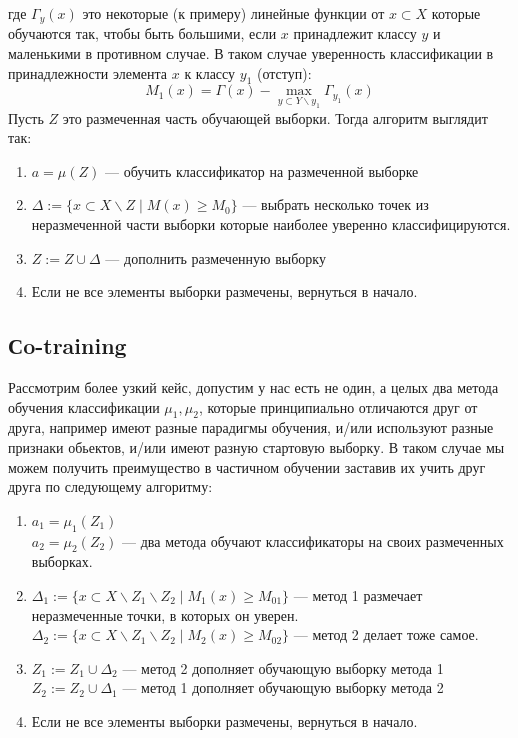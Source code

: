 где $\Gamma_y(x)$ это некоторые (к примеру) линейные функции от $x \subset X$ которые обучаются так, чтобы быть большими, если $x$ принадлежит классу $y$ и маленькими в противном случае. В таком случае уверенность классификации в принадлежности элемента $x$ к классу $y_1$ (отступ):
\begin{equation*}
    M_1(x) = \Gamma(x) - \max_{y \subset Y\backslash y_1}\Gamma_{y_1}(x)
\end{equation*}
Пусть $Z$ это размеченная часть обучающей выборки. Тогда алгоритм выглядит так:
\begin{enumerate}
    \item $a = \mu(Z)$ --- обучить классификатор на размеченной выборке
    \item $\Delta := \{x \subset X\backslash Z \;|\; M(x) \geq M_0 \}$ --- выбрать несколько точек из неразмеченной части выборки которые наиболее уверенно классифицируются.
    \item $Z := Z\cup\Delta$ --- дополнить размеченную выборку
    \item Если не все элементы выборки размечены, вернуться в начало.
\end{enumerate}
\subsection{Сo-training}
Рассмотрим более узкий кейс, допустим у нас есть не один, а целых два метода обучения классификации $\mu_1, \mu_2$, которые принципиально отличаются друг от друга, например имеют разные парадигмы обучения, и/или используют разные признаки обьектов, и/или имеют разную стартовую выборку. В таком случае мы можем получить преимущество в частичном обучении заставив их учить друг друга по следующему алгоритму:
\begin{enumerate}
    \item $a_1 = \mu_1(Z_1)$\\
          $a_2 = \mu_2(Z_2)$ --- два метода обучают классификаторы на своих размеченных выборках. 
    \item $\Delta_1 := \{x \subset X\backslash Z_1\backslash Z_2 \;|\; M_1(x) \geq M_{01} \}$ --- метод 1 размечает неразмеченные точки, в которых он уверен.\\
          $\Delta_2 := \{x \subset X\backslash Z_1\backslash Z_2 \;|\; M_2(x) \geq M_{02} \}$ --- метод 2 делает тоже самое.
    \item $Z_1 := Z_1\cup\Delta_2$ --- метод 2 дополняет обучающую выборку метода 1 \\
          $Z_2 := Z_2\cup\Delta_1$ --- метод 1 дополняет обучающую выборку метода 2
    \item Если не все элементы выборки размечены, вернуться в начало.
\end{enumerate}
